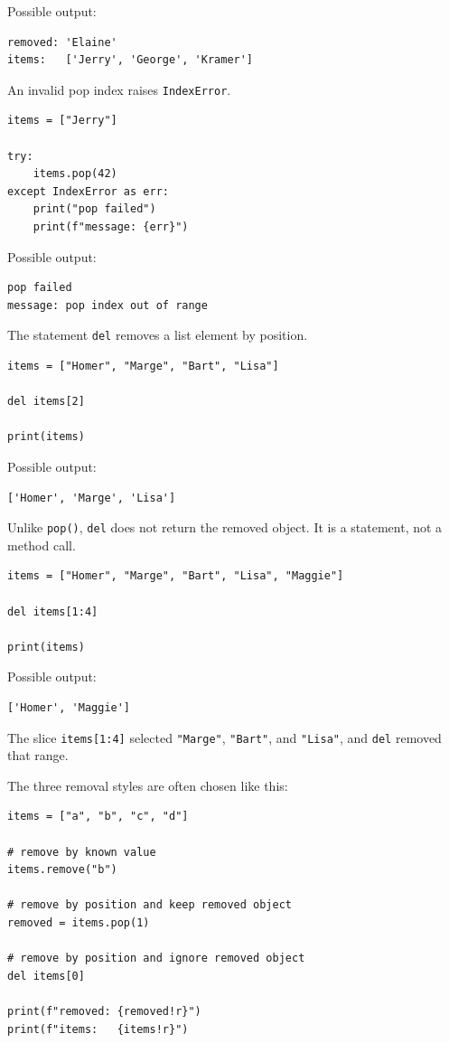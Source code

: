 Possible output:

\begin{verbatim}
removed: 'Elaine'
items:   ['Jerry', 'George', 'Kramer']
\end{verbatim}

An invalid pop index raises \texttt{IndexError}.

\begin{verbatim}
items = ["Jerry"]

try:
    items.pop(42)
except IndexError as err:
    print("pop failed")
    print(f"message: {err}")
\end{verbatim}

Possible output:

\begin{verbatim}
pop failed
message: pop index out of range
\end{verbatim}

The statement \texttt{del} removes a list element by position.

\begin{verbatim}
items = ["Homer", "Marge", "Bart", "Lisa"]

del items[2]

print(items)
\end{verbatim}

Possible output:

\begin{verbatim}
['Homer', 'Marge', 'Lisa']
\end{verbatim}

Unlike \texttt{pop()}, \texttt{del} does not return the removed object. It is a statement, not a method call.

\begin{verbatim}
items = ["Homer", "Marge", "Bart", "Lisa", "Maggie"]

del items[1:4]

print(items)
\end{verbatim}

Possible output:

\begin{verbatim}
['Homer', 'Maggie']
\end{verbatim}

The slice \texttt{items[1:4]} selected \texttt{"Marge"}, \texttt{"Bart"}, and \texttt{"Lisa"}, and \texttt{del} removed that range.

The three removal styles are often chosen like this:

\begin{verbatim}
items = ["a", "b", "c", "d"]

# remove by known value
items.remove("b")

# remove by position and keep removed object
removed = items.pop(1)

# remove by position and ignore removed object
del items[0]

print(f"removed: {removed!r}")
print(f"items:   {items!r}")
\end{verbatim}

